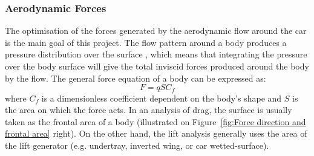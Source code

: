 \subsubsection{Aerodynamic Forces}
The optimisation of the forces generated by the aerodynamic flow around the car is the main goal of this project. The flow pattern around a body produces a pressure distribution over the surface \cite{Scibor-Rylski1984RoadAerodynamics}, which means that integrating the pressure over the body surface will give the total inviscid forces produced around the body by the flow. The general force equation of a body can be expressed as:
\begin{equation}
    F = qSC_f
\end{equation}
where $C_f$ is a dimensionless coefficient dependent on the body's shape \cite{Scibor-Rylski1984RoadAerodynamics} and $S$ is the area on which the force acts. In an analysis of drag, the surface is usually taken as the frontal area of a body (illustrated on Figure~\ref{fig:Force direction and frontal area} right). On the other hand, the lift analysis generally uses the area of the lift generator (e.g. undertray, inverted wing, or car wetted-surface).

